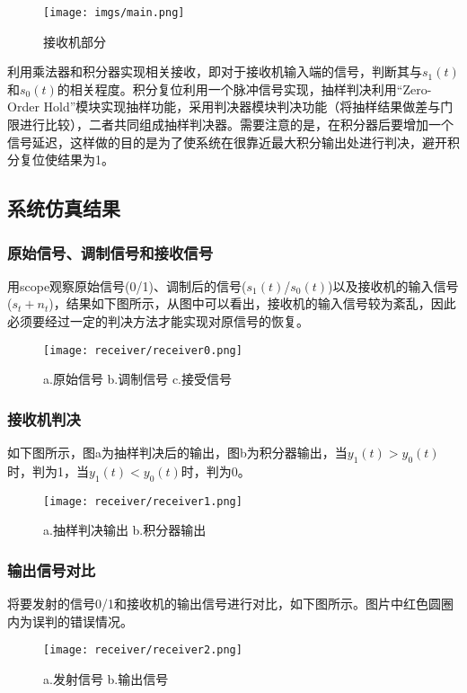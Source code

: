 \documentclass[a4paper]{article}
\begin{document}
\begin{figure}[htbp]
\centering
\texttt{[image: imgs/main.png]}
\caption{接收机部分}
\end{figure}
 利用乘法器和积分器实现相关接收，即对于接收机输入端的信号，判断其与$s_1(t)$和$s_0(t)$的相关程度。积分复位利用一个脉冲信号实现，抽样判决利用“Zero-Order Hold”模块实现抽样功能，采用判决器模块判决功能（将抽样结果做差与门限进行比较），二者共同组成抽样判决器。需要注意的是，在积分器后要增加一个信号延迟，这样做的目的是为了使系统在很靠近最大积分输出处进行判决，避开积分复位使结果为1。

\subsection{系统仿真结果}
\subsubsection{原始信号、调制信号和接收信号}
用scope观察原始信号(0/1)、调制后的信号($s_1(t)$/$s_0(t)$)以及接收机的输入信号($s_t+n_t$)，结果如下图所示，从图中可以看出，接收机的输入信号较为紊乱，因此必须要经过一定的判决方法才能实现对原信号的恢复。
\begin{figure}[htbp]
\centering
\texttt{[image: receiver/receiver0.png]}
\caption{a.原始信号 b.调制信号 c.接受信号}
\end{figure}

\subsubsection{接收机判决}
如下图所示，图a为抽样判决后的输出，图b为积分器输出，当$y_1(t) > y_0(t)$时，判为1，当$y_1(t) < y_0(t)$时，判为0。
\newpage
\begin{figure}[htbp]
\centering
\texttt{[image: receiver/receiver1.png]}
\caption{a.抽样判决输出 b.积分器输出}
\end{figure}

\subsubsection{输出信号对比}
将要发射的信号0/1和接收机的输出信号进行对比，如下图所示。图片中红色圆圈内为误判的错误情况。

\begin{figure}[htbp]
\centering
\texttt{[image: receiver/receiver2.png]}
\caption{a.发射信号 b.输出信号}
\end{figure}
\end{document}
